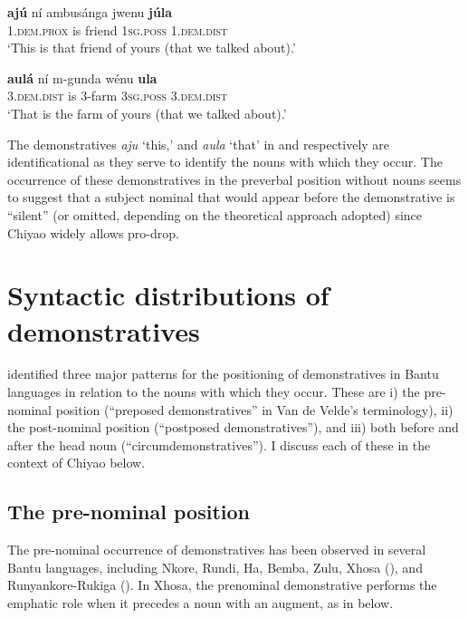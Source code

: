 \documentclass[output=paper,
            colorlinks, citecolor=brown
            ,draftmode
		  ]{langscibook}
\begin{document}
\ea%
    \label{ex:taji:19}
    \ea\label{ex:taji:19a}\gll \textbf{ajú}                        ní    ambusánga      jwenu   \textbf{júla}\\
    1.\textsc{dem.prox}      is    friend              \textsc{1sg.poss}    1.\textsc{dem.dist}\\        
  \glt ‘This is that friend of yours (that we talked about).’

    \ex\label{ex:taji:19b} \gll  \textbf{aulá}                   ní    m-gunda    wénu  \textbf{ula}\\
      3.\textsc{dem.dist}      is    3-farm        \textsc{3sg.poss}    3.\textsc{dem.dist}\\
    \glt  ‘That is the farm of yours (that we talked about).’
    \z
\z

The demonstratives \textit{aju} ‘this,’ and \textit{aula} ‘that’ in  and  respectively are identificational as they serve to identify the nouns with which they occur. The occurrence of these demonstratives in the preverbal position without nouns seems to suggest that a subject nominal that would appear before the demonstrative is ``silent'' (or omitted, depending on the theoretical approach adopted) since Chiyao widely allows pro-drop.

\section{Syntactic distributions of demonstratives}\label{sec:taji:5}

\citet{VandeVelde2005} identified three major patterns for the positioning of demonstratives in Bantu languages in relation to the nouns with which they occur. These are i) the pre-nominal position (``preposed demonstratives'' in Van de Velde’s terminology), ii) the post-nominal position (``postposed demonstratives''), and iii) both before and after the head noun (``circumdemonstratives''). I discuss each of these in the context of Chiyao below.

\subsection{The pre-nominal position}\label{sec:taji:5.1}

The pre-nominal occurrence of demonstratives has been observed in several Bantu languages, including Nkore, Rundi, Ha, Bemba, Zulu, Xhosa (\citealt{VandeVelde2005}), and Runyankore-Rukiga (). In Xhosa, the prenominal demonstrative performs the emphatic role when it precedes a noun with an augment, as in  below. 
\end{document}
